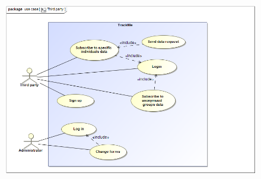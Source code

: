 \begin{figure}[h!] \ContinuedFloat
\centering
\includegraphics[scale=0.43]{sections/diagrams/Third_Party.png} \newline
{}
\end{figure}

\clearpage

